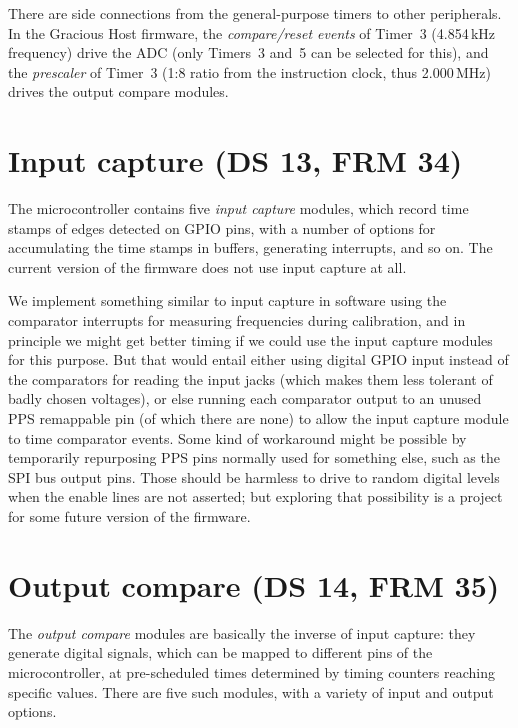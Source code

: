 There are side connections from the general-purpose timers to other
peripherals.  In the Gracious Host firmware, the \emph{compare/reset events}
of Timer~3 (4.854\,kHz frequency) drive the ADC (only Timers~3 and~5 can be
selected for this), and the \emph{prescaler} of Timer~3 (1:8 ratio from the
instruction clock, thus 2.000\,MHz) drives the output compare modules.


\section{Input capture (DS 13, FRM 34)}

The microcontroller contains five \emph{input capture} modules, which record
time stamps of edges detected on GPIO pins, with a number of options for
accumulating the time stamps in buffers, generating interrupts, and so on. 
The current version of the firmware does not use input capture at all.

We implement something similar to input capture in software using the
comparator interrupts for measuring frequencies during calibration, and in
principle we might get better timing if we could use the input capture
modules for this purpose.  But that would entail either using digital GPIO
input instead of the comparators for reading the input jacks (which makes
them less tolerant of badly chosen voltages), or else running each
comparator output to an unused PPS remappable pin (of which there are none)
to allow the input capture module to time comparator events.  Some kind of
workaround might be possible by temporarily repurposing PPS pins normally
used for something else, such as the SPI bus output pins.  Those should be
harmless to drive to random digital levels when the enable lines are not
asserted; but exploring that possibility is a project for some future
version of the firmware.


\section{Output compare (DS 14, FRM 35)}

The \emph{output compare} modules are basically the inverse of input
capture:  they generate digital signals, which can be mapped to different
pins of the microcontroller, at pre-scheduled times determined by timing
counters reaching specific values.  There are five such modules, with a
variety of input and output options.

